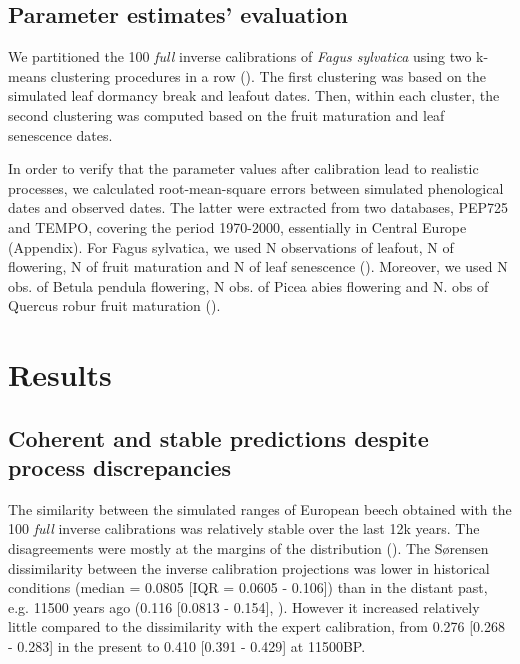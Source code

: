 \documentclass[letterpaper,8pt]{extarticle}  %
\begin{document}
\begin{doublespacing}
\begin{linenumbers}
\subsection{Parameter estimates' evaluation}

We partitioned the 100 \emph{full} inverse calibrations of \emph{Fagus sylvatica} using two k-means clustering procedures in a row (). The first clustering was based on the simulated leaf dormancy break and leafout dates. Then, within each cluster, the second clustering was computed based on the fruit maturation and leaf senescence dates.

In order to verify that the parameter values after calibration lead to realistic processes, we calculated root-mean-square errors between simulated phenological dates and observed dates. The latter were extracted from two databases, PEP725 and TEMPO, covering the period 1970-2000, essentially in Central Europe (Appendix). For Fagus sylvatica, we used N observations of leafout, N of flowering, N of fruit maturation and N of leaf senescence (). Moreover, we used N obs. of Betula pendula flowering, N obs. of Picea abies flowering and N. obs of Quercus robur fruit maturation ().


\section{Results}

\subsection{Coherent and stable predictions despite process discrepancies}

The similarity between the simulated ranges of European beech obtained with the 100 \emph{full} inverse calibrations was relatively stable over the last 12k years. The disagreements were mostly at the margins of the distribution (). The S\o rensen dissimilarity between the inverse calibration projections was lower in historical conditions (median = 0.0805 [IQR = 0.0605 - 0.106]) than in the distant past, e.g. 11500 years ago (0.116 [0.0813 - 0.154], ). However it increased relatively little compared to the dissimilarity with the expert calibration, from 0.276 [0.268 - 0.283] in the present to 0.410 [0.391 - 0.429] at 11500BP.


\end{linenumbers}
\end{doublespacing}
\end{document}
